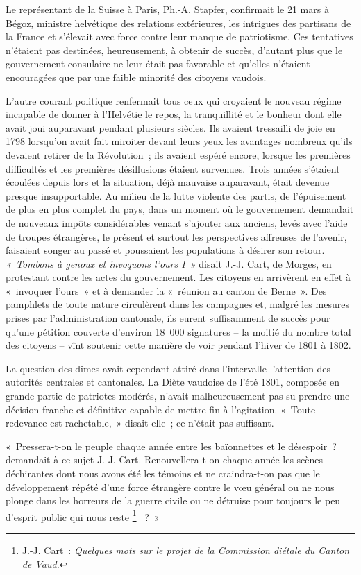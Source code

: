 \documentclass[french,twoside]{book} %
\newenvironment{quoteblock}%
  {\begin{quoting}}
  {\end{quoting}}
\newenvironment{quotebar}{%
    \def\FrameCommand{{\color{rubric!10!}\vrule width 0.5em} \hspace{0.9em}}%
    \def\OuterFrameSep{\itemsep} %
    \MakeFramed {\advance\hsize-\width \FrameRestore}
  }%
  {%
    \endMakeFramed
  }
\renewenvironment{quoteblock}%
  {%
    \savenotes
    \setstretch{0.9}
    \normalfont
    \begin{quotebar}
  }
  {%
    \end{quotebar}
    \spewnotes
  }
\begin{document}
\noindent Le représentant de la Suisse à Paris, Ph.-A. Stapfer, confirmait le 21 mars à Bégoz, ministre helvétique des relations extérieures, les intrigues des partisans de la France et s’élevait avec force contre leur manque de patriotisme. Ces tentatives n’étaient pas destinées, heureusement, à obtenir de succès, d’autant plus que le gouvernement consulaire ne leur était pas favorable et qu’elles n’étaient encouragées que par une faible minorité des citoyens vaudois.\par
L’autre courant politique renfermait tous ceux qui croyaient le nouveau régime incapable de donner à l’Helvétie le repos, la tranquillité et le bonheur dont elle avait joui auparavant pendant plusieurs siècles. Ils avaient tressailli de joie en 1798 lorsqu’on avait fait miroiter devant leurs yeux les avantages nombreux qu’ils devaient retirer de la Révolution ; ils avaient espéré encore, lorsque les premières difficultés et les premières désillusions étaient survenues. Trois années s’étaient écoulées depuis lors et la situation, déjà mauvaise auparavant, était devenue presque insupportable. Au milieu de la lutte violente des partis, de l’épuisement de plus en plus complet du pays, dans un moment où le gouvernement demandait de nouveaux impôts considérables venant s’ajouter aux anciens, levés avec l’aide de troupes étrangères, le présent et surtout les perspectives affreuses de l’avenir, faisaient songer au passé et poussaient les populations à désirer son retour. \emph{« Tombons à genoux et invoquons l’ours I »} disait J.-J. Cart, de Morges, en protestant contre les actes du gouvernement. Les citoyens en arrivèrent en effet à « invoquer l’ours » et à demander la « réunion au canton de Berne ». Des pamphlets de toute nature circulèrent dans les campagnes et, malgré les mesures prises par l’administration cantonale, ils eurent suffisamment de succès pour qu’une pétition couverte d’environ 18 000 signatures – la moitié du nombre total des citoyens – vînt soutenir cette manière de voir pendant l’hiver de 1801 à 1802.\par
La question des dîmes avait cependant attiré dans l’intervalle l’attention des autorités centrales et cantonales. La Diète vaudoise de l’été 1801, composée en grande partie de patriotes modérés, n’avait malheureusement pas su prendre une décision franche et définitive capable de mettre fin à l’agitation. « Toute redevance est rachetable, » disait-elle ; ce n’était pas suffisant.\par

\begin{quoteblock}
 \noindent « Pressera-t-on le peuple chaque année entre les baïonnettes et le désespoir ? demandait à ce sujet J.-J. Cart. Renouvellera-t-on chaque année les scènes déchirantes dont nous avons été les témoins et ne craindra-t-on pas que le développement répété d’une force étrangère contre le vœu général ou ne nous plonge dans les horreurs de la guerre civile ou ne détruise pour toujours le peu d’esprit public qui nous reste \footnote{J.-J. Cart : \emph{Quelques mots sur le projet de la Commission diétale du Canton de Vaud.}}  ? »
 \end{quoteblock}
\end{document}
